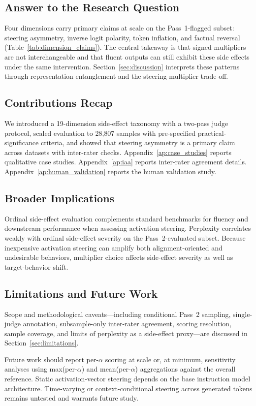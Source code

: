 \subsection{Answer to the Research Question}
Four dimensions carry primary claims at scale on the Pass~1-flagged subset: steering asymmetry, inverse logit polarity, token inflation, and factual reversal (Table~\ref{tab:dimension_claims}).
The central takeaway is that signed multipliers are not interchangeable and that fluent outputs can still exhibit these side effects under the same intervention.
Section~\ref{sec:discussion} interprets these patterns through representation entanglement and the steering-multiplier trade-off.

\subsection{Contributions Recap}
We introduced a 19-dimension side-effect taxonomy with a two-pass judge protocol, scaled evaluation to 28{,}807 samples with pre-specified practical-significance criteria, and showed that steering asymmetry is a primary claim across datasets with inter-rater checks.
Appendix~\ref{ap:case_studies} reports qualitative case studies.
Appendix~\ref{ap:iaa} reports inter-rater agreement details.
Appendix~\ref{ap:human_validation} reports the human validation study.

\subsection{Broader Implications}
Ordinal side-effect evaluation complements standard benchmarks for fluency and downstream performance when assessing activation steering.
Perplexity correlates weakly with ordinal side-effect severity on the Pass~2-evaluated subset.
Because inexpensive activation steering can amplify both alignment-oriented and undesirable behaviors, multiplier choice affects side-effect severity as well as target-behavior shift.

\subsection{Limitations and Future Work}
Scope and methodological caveats---including conditional Pass~2 sampling, single-judge annotation, subsample-only inter-rater agreement, scoring resolution, sample coverage, and limits of perplexity as a side-effect proxy---are discussed in Section~\ref{sec:limitations}.

Future work should report per-$\alpha$ scoring at scale or, at minimum, sensitivity analyses using max(per-$\alpha$) and mean(per-$\alpha$) aggregations against the overall reference.
Static activation-vector steering depends on the base instruction model architecture.
Time-varying or context-conditional steering across generated tokens remains untested and warrants future study.

